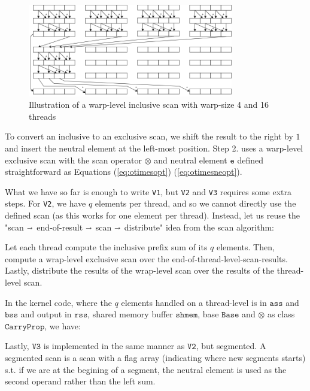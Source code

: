 \begin{figure}
  \centering
  \includegraphics[width=0.8\textwidth]{img/warp-level-scan.png}
  \caption{Illustration of a warp-level inclusive scan with warp-size 4 and 16 threads}
  \label{fig:warpscan}
\end{figure}

To convert an inclusive to an exclusive scan, we shift the result to the right
by $1$ and insert the neutral element at the left-most position. Step 2. uses a
warp-level exclusive scan with the scan operator $\otimes$ and neutral element
$\mathtt{e}$ defined straightforward as Equations (\ref{eq:otimesopt})
(\ref{eq:otimesneopt}).

What we have so far is enough to write \texttt{V1}, but \texttt{V2} and
\texttt{V3} requires some extra steps. For \texttt{V2}, we have $q$ elements per
thread, and so we cannot directly use the defined scan (as this works for one
element per thread). Instead, let us reuse the "scan $\shortrightarrow$
end-of-result $\shortrightarrow$ scan $\shortrightarrow$ distribute" idea from
the scan algorithm:

Let each thread compute the inclusive prefix sum of its $q$ elements. Then,
compute a wrap-level exclusive scan over the
end-of-thread-level-scan-results. Lastly, distribute the results of the
wrap-level scan over the results of the thread-level scan.

In the kernel code, where the $q$ elements handled on a thread-level is in
$\mathtt{ass}$ and $\mathtt{bss}$ and output in $\mathtt{rss}$, shared memory
buffer $\mathtt{shmem}$, base $\mathtt{Base}$ and $\otimes$ as class
$\mathtt{CarryProp}$, we have:



Lastly, $\mathtt{V3}$ is implemented in the same manner as $\mathtt{V2}$, but
segmented. A segmented scan is a scan with a flag array (indicating where new
segments starts) s.t. if we are at the begining of a segment, the neutral
element is used as the second operand rather than the left sum.

